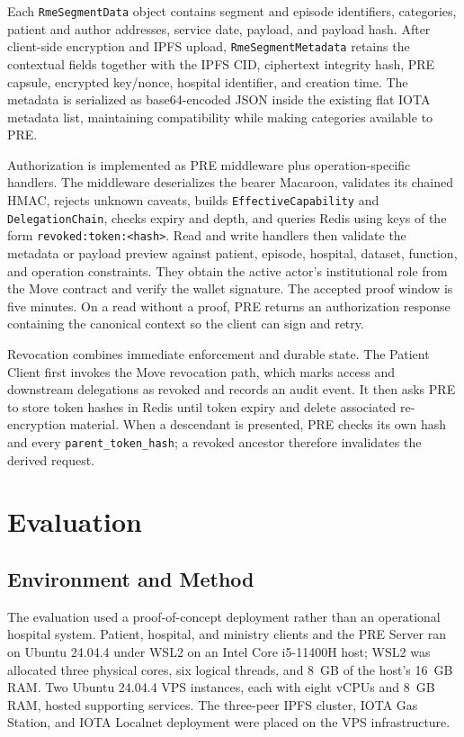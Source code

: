 Each \texttt{RmeSegmentData} object contains segment and episode identifiers, categories, patient and author addresses, service date, payload, and payload hash. After client-side encryption and IPFS upload, \texttt{RmeSegmentMetadata} retains the contextual fields together with the IPFS CID, ciphertext integrity hash, PRE capsule, encrypted key/nonce, hospital identifier, and creation time. The metadata is serialized as base64-encoded JSON inside the existing flat IOTA metadata list, maintaining compatibility while making categories available to PRE.

Authorization is implemented as PRE middleware plus operation-specific handlers. The middleware deserializes the bearer Macaroon, validates its chained HMAC, rejects unknown caveats, builds \texttt{EffectiveCapability} and \texttt{DelegationChain}, checks expiry and depth, and queries Redis using keys of the form \texttt{revoked:token:<hash>}. Read and write handlers then validate the metadata or payload preview against patient, episode, hospital, dataset, function, and operation constraints. They obtain the active actor's institutional role from the Move contract and verify the wallet signature. The accepted proof window is five minutes. On a read without a proof, PRE returns an authorization response containing the canonical context so the client can sign and retry.

Revocation combines immediate enforcement and durable state. The Patient Client first invokes the Move revocation path, which marks access and downstream delegations as revoked and records an audit event. It then asks PRE to store token hashes in Redis until token expiry and delete associated re-encryption material. When a descendant is presented, PRE checks its own hash and every \texttt{parent\_token\_hash}; a revoked ancestor therefore invalidates the derived request.

\section{Evaluation}
\label{sec:evaluation}

\subsection{Environment and Method}

The evaluation used a proof-of-concept deployment rather than an operational hospital system. Patient, hospital, and ministry clients and the PRE Server ran on Ubuntu 24.04.4 under WSL2 on an Intel Core i5-11400H host; WSL2 was allocated three physical cores, six logical threads, and 8~GB of the host's 16~GB RAM. Two Ubuntu 24.04.4 VPS instances, each with eight vCPUs and 8~GB RAM, hosted supporting services. The three-peer IPFS cluster, IOTA Gas Station, and IOTA Localnet deployment were placed on the VPS infrastructure.

